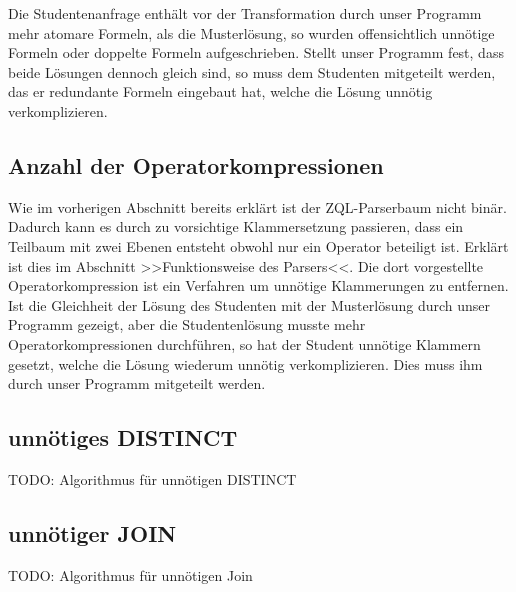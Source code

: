 Die Studentenanfrage enthält vor der Transformation durch unser Programm mehr atomare Formeln, als die Musterlösung, so wurden offensichtlich unnötige Formeln oder doppelte Formeln aufgeschrieben. Stellt unser Programm fest, dass beide Lösungen dennoch gleich sind, so muss dem Studenten mitgeteilt werden, das er redundante Formeln eingebaut hat, welche die Lösung unnötig verkomplizieren. 

\subsection{Anzahl der Operatorkompressionen}

Wie im vorherigen Abschnitt bereits erklärt ist der ZQL-Parserbaum nicht binär. Dadurch kann es durch zu vorsichtige Klammersetzung passieren, dass ein Teilbaum mit zwei Ebenen entsteht obwohl nur ein Operator beteiligt ist. Erklärt ist dies im Abschnitt >>Funktionsweise des Parsers<<. Die dort vorgestellte Operatorkompression ist ein Verfahren um unnötige Klammerungen zu entfernen. Ist die Gleichheit der Lösung des Studenten mit der Musterlösung durch unser Programm gezeigt, aber die Studentenlösung musste mehr Operatorkompressionen durchführen, so hat der Student unnötige Klammern gesetzt, welche die Lösung wiederum unnötig verkomplizieren. Dies muss ihm durch unser Programm mitgeteilt werden.

\subsection{unnötiges DISTINCT}

TODO: Algorithmus für unnötigen DISTINCT

\subsection{unnötiger JOIN}

TODO: Algorithmus für unnötigen Join

